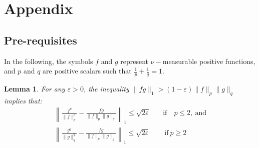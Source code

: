 \documentclass{article} %
\newcommand{\f}{f}
\newcommand{\g}{g}
\newcommand{\q}{q}
\def\p{p}
\newtheorem{lemma}{Lemma}
\begin{document}

\newpage







\renewcommand{\f}{f}
\renewcommand{\g}{g}
\renewcommand{\p}{p}
\renewcommand{\q}{q}

\newpage
\vspace{-0.1in}
\section*{Appendix}
\vspace{-0.1in}
\subsection*{Pre-requisites}
In the following, the symbols $\f$ and $\g$ represent $\nu-$measurable positive functions, and $\p$ and $\q$ are positive  scalars such that $\frac 1\p+\frac 1\q=1$.


\vspace{-0.1in}
\begin{lemma}  
\label{lem:approx0}
For any $\varepsilon>0$, the inequality $\|\f\g\|_1> (1-\varepsilon) \|\f\|_\p \|\g\|_\q$ implies that:
\begin{align}
\left\|
	\frac{\f^{\p}}{\|\f\|^{\p}_{\p}} 
	- 
	\frac{\f\g}{\|\f\|_\p \|\g\|_\q} 
\right\|_1 \le \sqrt{2\varepsilon}
\quad &  \mathrm{if} \quad \p \le 2, \mathrm{\ and}
\nonumber
\\
\left\|
	\frac{\g^{\q}}{\|\g\|^{\q}_{\q}} 
	- 
	\frac{\f\g}{\|\f\|_\p \|\g\|_\q} 
\right\|_1 \le \sqrt{2\varepsilon} 
\quad  & \mathrm{\ if \ } \p\ge 2
\label{eq:fbigger}
\end{align}
\end{lemma} 

\vspace{-0.1in}
\end{document}
